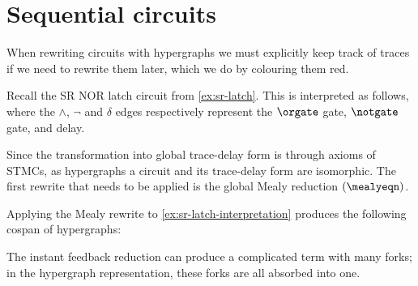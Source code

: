 \section{Sequential circuits}

When rewriting circuits with hypergraphs we must explicitly keep track of
traces if we need to rewrite them later, which we do by colouring them red.

\begin{example}\label{ex:sr-latch-interpretation}
    Recall the SR NOR latch circuit from \cref{ex:sr-latch}.
    This is interpreted as
    follows, where the \(\wedge\), \(\neg\) and \(\delta\) edges respectively
    represent the \(\orgate\) gate, \(\notgate\) gate, and delay.
    \begin{center}
    \end{center}
\end{example}

Since the transformation into global trace-delay form is through axioms
of STMCs, as hypergraphs a circuit and its trace-delay form are isomorphic.
The first rewrite that needs to be applied is the global Mealy reduction
\((\mealyeqn)\).

\begin{example}\label{ex:sr-latch-mealy-graph}
    Applying the Mealy rewrite to \cref{ex:sr-latch-interpretation} produces
    the following cospan of hypergraphs:
    \vspace{-1em}
    \begin{center}
    \end{center}
\end{example}

The instant feedback reduction can produce a complicated term with many forks;
in the hypergraph representation, these forks are all absorbed into one.

